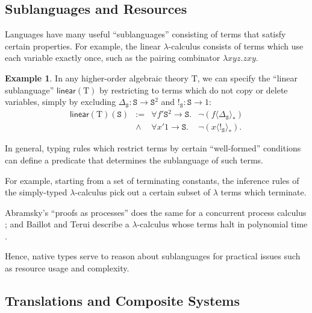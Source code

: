 \documentclass[12pt]{article}
\theoremstyle{definition}
\newtheorem{example}[theorem]{Example}
\newcommand{\msf}[1]{\mathsf{#1}}
\newcommand{\mrm}[1]{\mathrm{#1}}
\newcommand{\mtt}[1]{\mathtt{#1}}
\newcommand{\T}{\mrm{T}}
\newcommand{\tts}{\mtt{S}}
\begin{document}

\subsection{Sublanguages and Resources}
\label{ssec:sublang}

Languages have many useful ``sublanguages'' consisting of terms that satisfy certain properties. For example, the linear $\lambda$-calculus consists of terms which use each variable exactly once, such as the pairing combinator $\lambda xyz.zxy$.

\begin{example}
    In any higher-order algebraic theory $\T$, we can specify the ``linear sublanguage'' $\msf{linear}(\T)$ by restricting to terms which do not copy or delete variables, simply by excluding $\Delta_\tts:\tts\to \tts^2$ and $!_\tts:\tts\to 1$:
    \[\begin{array}{lcll}
        \msf{linear}(\T)(\tts) & := &  \forall f'\tts^2 \to \tts. & \neg(f \langle\Delta_\tts\rangle_*)\\
        & \land & \forall x'1\to \tts. & \neg(x\langle!_\tts\rangle_*).
    \end{array}\]
\end{example}

In general, typing rules which restrict terms by certain ``well-formed'' conditions can define a predicate that determines the sublanguage of such terms.

For example, starting from a set of terminating constants, the inference rules of the simply-typed $\lambda$-calculus pick out a certain subset of $\lambda$ terms which terminate.

Abramsky's ``proofs as processes'' does the same for a concurrent process calculus \cite{ProofAsProcess}; and Baillot and Terui describe a $\lambda$-calculus whose terms halt in polynomial time \cite{BaillotTerui}.

Hence, native types serve to reason about sublanguages for practical issues such as resource usage and complexity.

\subsection{Translations and Composite Systems}
\label{ssec:composite}
\end{document}
